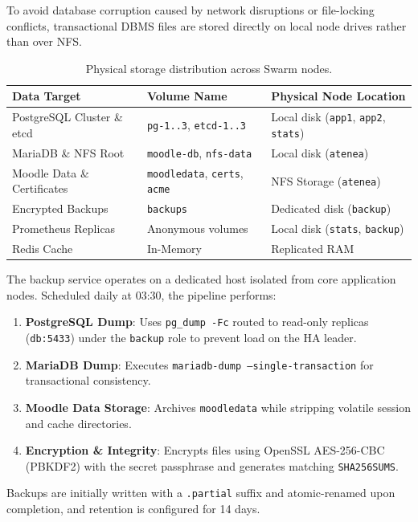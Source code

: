\documentclass[11pt,a4paper]{article}
\begin{document}
To avoid database corruption caused by network disruptions or file-locking conflicts, transactional DBMS files are stored directly on local node drives rather than over NFS.

\begin{table}[H]
\centering\small
\begin{tabular}{lll}
\toprule
\textbf{Data Target} & \textbf{Volume Name} & \textbf{Physical Node Location} \\
\midrule
PostgreSQL Cluster \& etcd & \texttt{pg-1..3}, \texttt{etcd-1..3} & Local disk (\texttt{app1}, \texttt{app2}, \texttt{stats}) \\
MariaDB \& NFS Root & \texttt{moodle-db}, \texttt{nfs-data} & Local disk (\texttt{atenea}) \\
Moodle Data \& Certificates & \texttt{moodledata}, \texttt{certs}, \texttt{acme} & NFS Storage (\texttt{atenea}) \\
Encrypted Backups & \texttt{backups} & Dedicated disk (\texttt{backup}) \\
Prometheus Replicas & Anonymous volumes & Local disk (\texttt{stats}, \texttt{backup}) \\
Redis Cache & In-Memory & Replicated RAM \\
\bottomrule
\end{tabular}
\caption{Physical storage distribution across Swarm nodes.}
\label{tab:storage_layout}
\end{table}

The backup service operates on a dedicated host isolated from core application nodes. Scheduled daily at 03:30, the pipeline performs:
\begin{enumerate}
    \item \textbf{PostgreSQL Dump}: Uses \texttt{pg\_dump -Fc} routed to read-only replicas (\texttt{db:5433}) under the \texttt{backup} role to prevent load on the HA leader.
    \item \textbf{MariaDB Dump}: Executes \texttt{mariadb-dump --single-transaction} for transactional consistency.
    \item \textbf{Moodle Data Storage}: Archives \texttt{moodledata} while stripping volatile session and cache directories.
    \item \textbf{Encryption \& Integrity}: Encrypts files using OpenSSL AES-256-CBC (PBKDF2) with the secret passphrase and generates matching \texttt{SHA256SUMS}.
\end{enumerate}

Backups are initially written with a \texttt{.partial} suffix and atomic-renamed upon completion, and retention is configured for 14 days.
\end{document}
